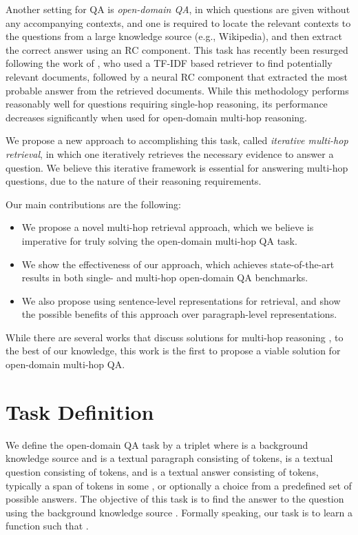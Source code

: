 \documentclass[11pt,a4paper,dvipsnames]{article}
\begin{document}
Another setting for QA is \emph{open-domain QA}, in which questions are given without any accompanying contexts, and one is required to locate the relevant contexts to the questions from a large knowledge source (e.g., Wikipedia), and then extract the correct answer using an RC component. This task has recently been resurged following the work of \citet{ChenFWB17drqa}, who used a TF-IDF based retriever to find potentially relevant documents, followed by a neural RC component that extracted the most probable answer from the retrieved documents. While this methodology performs reasonably well for questions requiring single-hop reasoning, its performance decreases significantly when used for open-domain multi-hop reasoning. \par
We propose a new approach to accomplishing this task, called \emph{iterative multi-hop retrieval}, in which one iteratively retrieves the necessary evidence to answer a question. We believe this iterative framework is essential for answering multi-hop questions, due to the nature of their reasoning requirements. \par
Our main contributions are the following:
\begin{itemize}
    \item We propose a novel multi-hop retrieval approach, which we believe is imperative for truly solving the open-domain multi-hop QA task.
    \item We show the effectiveness of our approach, which achieves state-of-the-art results in both single- and multi-hop open-domain QA benchmarks.
    \item We also propose using sentence-level representations for retrieval, and show the possible benefits of this approach over paragraph-level representations.
\end{itemize}
While there are several works that discuss solutions for multi-hop reasoning \cite{dhingra2018multiCoref, zhong2018coarsegrain}, to the best of our knowledge, this work is the first to propose a viable solution for open-domain multi-hop QA.

\section{Task Definition}
We define the open-domain QA task by a triplet  where  is a background knowledge source and  is a textual paragraph consisting of  tokens,  is a textual question consisting of  tokens, and  is a textual answer consisting of  tokens, typically a span of tokens  in some , or optionally a choice from a predefined set of possible answers. The objective of this task is to find the answer  to the question  using the background knowledge source . Formally speaking, our task is to learn a function  such that .
\end{document}
